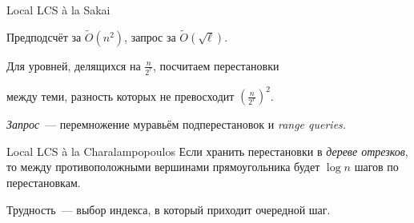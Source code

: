 \documentclass[svgnames]{beamer}
\begin{document}
\begin{frame}{Local LCS à la Sakai}

Предподсчёт за \(\tilde O\left(n^2\right)\), запрос за \(\tilde O\left( \sqrt{\ell} \right)\).
\vspace{3mm}

Для уровней, делящихся на \(\frac{n}{2^r}\), посчитаем перестановки \vspace{-2mm}

между теми, разность которых не превосходит \(\left( \frac{n}{2^r} \right)^2\).

\begin{center}  \end{center}

{\it Запрос}~— перемножение муравьём подперестановок и {\it range queries.}

\end{frame}


\begin{frame}{Local LCS à la Charalampopoulos}
Если хранить перестановки в {\it дереве отрезков}, то между противоположными вершинами прямоугольника будет \(\log n\) шагов по перестановкам. \vspace{4mm}

Трудность~— выбор индекса, в который приходит очередной шаг.
\end{frame}
\end{document}
